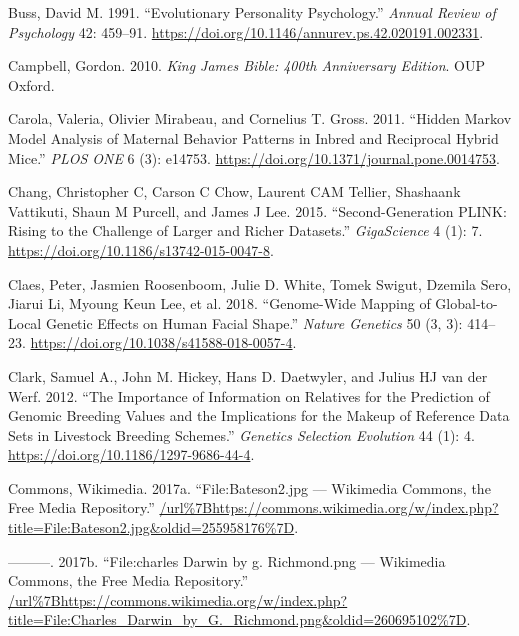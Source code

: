 \documentclass[
]{book}
\newlength{\cslhangindent}
\newlength{\cslentryspacingunit} %
\newenvironment{CSLReferences}[2] %
 {%
  \setlength{\parindent}{0pt}
  \ifodd #1
  \let\oldpar\par
  \def\par{\hangindent=\cslhangindent\oldpar}
  \fi
  \setlength{\parskip}{#2\cslentryspacingunit}
 }%
 {}
\begin{document}
\begin{CSLReferences}{1}{0}
\leavevmode{}%
Buss, David M. 1991. {``Evolutionary Personality Psychology.''} \emph{Annual Review of Psychology} 42: 459--91. \url{https://doi.org/10.1146/annurev.ps.42.020191.002331}.

\leavevmode{}%
Campbell, Gordon. 2010. \emph{King {James Bible}: 400th {Anniversary Edition}}. {OUP Oxford}.

\leavevmode{}%
Carola, Valeria, Olivier Mirabeau, and Cornelius T. Gross. 2011. {``Hidden {Markov Model Analysis} of {Maternal Behavior Patterns} in {Inbred} and {Reciprocal Hybrid Mice}.''} \emph{PLOS ONE} 6 (3): e14753. \url{https://doi.org/10.1371/journal.pone.0014753}.

\leavevmode{}%
Chang, Christopher C, Carson C Chow, Laurent CAM Tellier, Shashaank Vattikuti, Shaun M Purcell, and James J Lee. 2015. {``Second-Generation {PLINK}: Rising to the Challenge of Larger and Richer Datasets.''} \emph{GigaScience} 4 (1): 7. \url{https://doi.org/10.1186/s13742-015-0047-8}.

\leavevmode{}%
Claes, Peter, Jasmien Roosenboom, Julie D. White, Tomek Swigut, Dzemila Sero, Jiarui Li, Myoung Keun Lee, et al. 2018. {``Genome-Wide Mapping of Global-to-Local Genetic Effects on Human Facial Shape.''} \emph{Nature Genetics} 50 (3, 3): 414--23. \url{https://doi.org/10.1038/s41588-018-0057-4}.

\leavevmode{}%
Clark, Samuel A., John M. Hickey, Hans D. Daetwyler, and Julius HJ van der Werf. 2012. {``The Importance of Information on Relatives for the Prediction of Genomic Breeding Values and the Implications for the Makeup of Reference Data Sets in Livestock Breeding Schemes.''} \emph{Genetics Selection Evolution} 44 (1): 4. \url{https://doi.org/10.1186/1297-9686-44-4}.

\leavevmode{}%
Commons, Wikimedia. 2017a. {``File:Bateson2.jpg --- Wikimedia Commons{,} the Free Media Repository.''} \url{/url\%7Bhttps://commons.wikimedia.org/w/index.php?title=File:Bateson2.jpg\&oldid=255958176\%7D}.

\leavevmode{}%
---------. 2017b. {``File:charles Darwin by g. Richmond.png --- Wikimedia Commons{,} the Free Media Repository.''} \url{/url\%7Bhttps://commons.wikimedia.org/w/index.php?title=File:Charles_Darwin_by_G._Richmond.png\&oldid=260695102\%7D}.


\end{CSLReferences}
\end{document}
